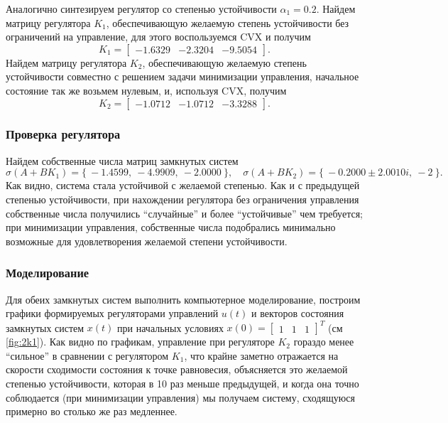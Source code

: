 Аналогично синтезируем регулятор со степенью устойчивости $\alpha_1=0.2$.
Найдем матрицу регулятора $K_1$, обеспечивающую желаемую степень 
устойчивости без ограничений на управление, для этого воспользуемся CVX и получим
\begin{equation*}
    K_1=\begin{bmatrix}
        -1.6329&	-2.3204&	-9.5054
    \end{bmatrix}.
\end{equation*}
Найдем матрицу регулятора $K_2$, обеспечивающую желаемую степень 
устойчивости совместно с решением задачи минимизации управления,
начальное состояние так же возьмем нулевым, и, используя CVX, получим
\begin{equation*}
    K_2=\begin{bmatrix}
        -1.0712&	-1.0712&	-3.3288
    \end{bmatrix}.
\end{equation*}


\subsubsection{Проверка регулятора}

Найдем собственные числа матриц замкнутых систем
\begin{equation*}
    \sigma(A+BK_1)=\{\ -1.4599,\    -4.9909,\    -2.0000\ \},\quad
    \sigma(A+BK_2)=\{\ -0.2000 \pm 2.0010i,\ -2\ \}.
\end{equation*}
Как видно, система стала устойчивой с желаемой степенью. 
Как и с предыдущей степенью устойчивости, при нахождении
регулятора без ограничения управления собственные числа получились ``случайные''
и более ``устойчивые'' чем требуется; при минимизации управления, собственные
числа подобрались минимально возможные для удовлетворения желаемой степени устойчивости.


\subsubsection{Моделирование}

Для обеих замкнутых систем выполнить компьютерное моделирование,
построим графики формируемых регуляторами управлений $u(t)$ и векторов
состояния замкнутых систем $x(t)$ при начальных условиях $x(0) =\begin{bmatrix}
    1&1&1
\end{bmatrix}^T$ (см \autoref{fig:2k1}). Как видно по графикам, управление
при регуляторе $K_2$ гораздо менее ``сильное'' в сравнении с регулятором $K_1$, 
что крайне заметно отражается на скорости сходимости состояния к точке равновесия,
объясняется это желаемой степенью устойчивости, которая в 10 раз меньше предыдущей,
и когда она точно соблюдается (при минимизации управления) мы получаем систему,
сходящуюся примерно во столько же раз медленнее.

